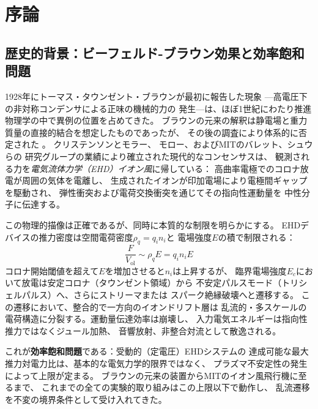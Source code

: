 \documentclass[12pt,twocolumn]{ltjsarticle}
\begin{document}
\section{序論}
\label{sec:introduction}

\subsection{歴史的背景：ビーフェルド-ブラウン効果と効率飽和問題}
\label{sec:intro:history}

1928年にトーマス・タウンゼント・ブラウンが最初に報告した現象
\cite{Brown1928}---高電圧下の非対称コンデンサによる正味の機械的力の
発生---は、ほぼ1世紀にわたり推進物理学の中で異例の位置を占めてきた。
ブラウンの元来の解釈は静電場と重力質量の直接的結合を想定したものであったが、
その後の調査により体系的に否定された
\cite{Christenson1967, Tajmar2004, Canning2004}。
クリステンソンとモラー\cite{Christenson1967}、
モロー\cite{Moreau2007}、およびMITのバレット、シュウらの
研究グループ\cite{Xu2018}の業績により確立された現代的なコンセンサスは、
観測される力を\emph{電気流体力学（EHD）イオン風}に帰している：
高曲率電極でのコロナ放電が周囲の気体を電離し、
生成されたイオンが印加電場により電極間ギャップを駆動され、
弾性衝突および電荷交換衝突を通じてその指向性運動量を
中性分子に伝達する。

この物理的描像は正確であるが、同時に本質的な制限を明らかにする。
EHDデバイスの推力密度は空間電荷密度$\rho_q = q_i n_i$と
電場強度$E$の積で制限される：
\begin{equation}
  \frac{F}{V_{\mathrm{ol}}} \sim \rho_q E
  = q_i n_i E
  \label{eq:intro:thrust_density}
\end{equation}
コロナ開始閾値を超えて$E$を増加させると$n_i$は上昇するが、
臨界電場強度$E_c$において放電は安定コロナ（タウンゼント領域）から
不安定パルスモード（トリシェルパルス）へ、さらにストリーマまたは
スパーク絶縁破壊へと遷移する\cite{Raizer1991, Moreau2007}。
この遷移において、整合的で一方向のイオンドリフト層は
乱流的・多スケールの電荷構造に分裂する。運動量伝達効率は崩壊し、
入力電気エネルギーは指向性推力ではなくジュール加熱、
音響放射、非整合対流として散逸される。

これが\textbf{効率飽和問題}である：受動的（定電圧）EHDシステムの
達成可能な最大推力対電力比は、基本的な電気力学的限界ではなく、
プラズマ不安定性の発生によって上限が定まる。
ブラウンの元来の装置からMITのイオン風飛行機\cite{Xu2018}に至るまで、
これまでの全ての実験的取り組みはこの上限以下で動作し、
乱流遷移を不変の境界条件として受け入れてきた。
\end{document}

